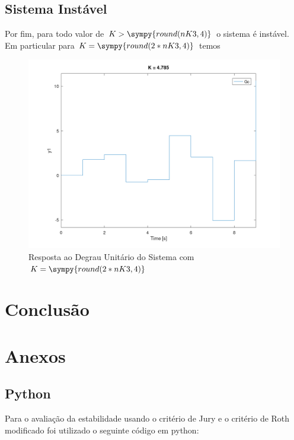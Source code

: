 \documentclass[a4paper,11pt]{article}
\newcommand{\npy}[1]{\sympy{round(#1,4)}}
\begin{document}
\subsection{Sistema Instável}

Por fim, para todo valor de $K > \npy{nK3}$ o sistema é instável. Em particular para $K = \npy{2*nK3}$ temos

\begin{figure}[H]
    \centering
    \includegraphics[width=0.8\linewidth]{img/exsim1-plot-instable.png}
    \caption{Resposta ao Degrau Unitário do Sistema com $K = \npy{2*nK3}$}
\end{figure}


\section{Conclusão}




\nocite{sympy}



\section{Anexos}
\subsection{Python}

Para o avaliação da estabilidade usando o critério de Jury e o critério de Roth modificado foi utilizado o seguinte código em python:
\end{document}
